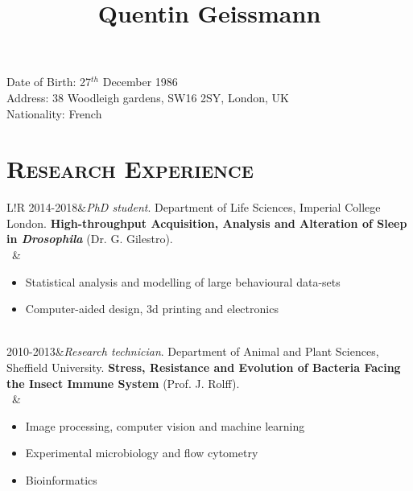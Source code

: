 \documentclass[109pt]{article}
\title{\bfseries\Huge Quentin Geissmann}
\author{\href{mailto:\sendTo}{\mymail}}
\date{}
\newcommand\VRule{\color{lightgray}\vrule width 0.5pt}
\begin{document}
\maketitle

\begin{minipage}[ht]{0.48\textwidth}
Date of Birth: 27$^{th}$ December 1986\\
Address: 38 Woodleigh gardens, SW16 2SY, London, UK\\
Nationality: French\\
\end{minipage}
\vspace{1pt}
\section*{\textsc{Research Experience}}
	\begin{longtable}{L!{\VRule}R}
	2014-2018&\emph{PhD student}. Department of Life Sciences, Imperial College London.
	\textbf{High-throughput Acquisition, Analysis and Alteration of Sleep in \emph{Drosophila}} 
	(Dr. G. Gilestro).
	\vspace{2pt}\\
	~&%
	\begin{itemize}[topsep=\parskip]
		\setlength\itemsep{-.3em}
		\item Statistical analysis and modelling of large behavioural data-sets 
		\item Computer-aided design, 3d printing and electronics
	\end{itemize}
	\vspace{3pt}\\
	2010-2013&\emph{Research technician}. 
	Department of Animal and Plant Sciences, Sheffield University.
	\textbf{Stress, Resistance and Evolution of Bacteria Facing the Insect Immune System}
	(Prof. J. Rolff).\\
		~&\begin{itemize}[topsep=\parskip]
			\setlength\itemsep{-.3em}
			\item Image processing, computer vision and machine learning
			\item Experimental microbiology and flow cytometry
			\item Bioinformatics
		\end{itemize}
	\vspace{3pt}\\

\end{longtable}
\end{document}
